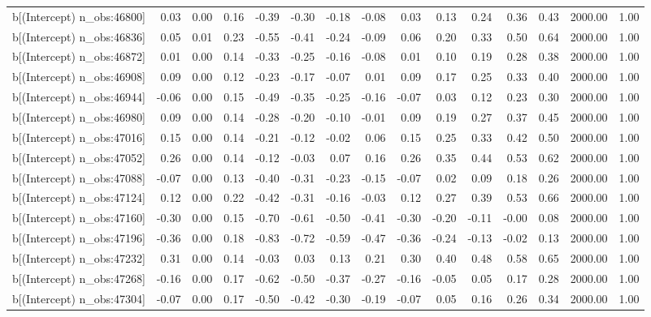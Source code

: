 \begin{table}[ht]
\begin{tabular}{rrrrrrrrrrrrrrr}
  b[(Intercept) n\_obs:46800] & 0.03 & 0.00 & 0.16 & -0.39 & -0.30 & -0.18 & -0.08 & 0.03 & 0.13 & 0.24 & 0.36 & 0.43 & 2000.00 & 1.00 \\ 
  b[(Intercept) n\_obs:46836] & 0.05 & 0.01 & 0.23 & -0.55 & -0.41 & -0.24 & -0.09 & 0.06 & 0.20 & 0.33 & 0.50 & 0.64 & 2000.00 & 1.00 \\ 
  b[(Intercept) n\_obs:46872] & 0.01 & 0.00 & 0.14 & -0.33 & -0.25 & -0.16 & -0.08 & 0.01 & 0.10 & 0.19 & 0.28 & 0.38 & 2000.00 & 1.00 \\ 
  b[(Intercept) n\_obs:46908] & 0.09 & 0.00 & 0.12 & -0.23 & -0.17 & -0.07 & 0.01 & 0.09 & 0.17 & 0.25 & 0.33 & 0.40 & 2000.00 & 1.00 \\ 
  b[(Intercept) n\_obs:46944] & -0.06 & 0.00 & 0.15 & -0.49 & -0.35 & -0.25 & -0.16 & -0.07 & 0.03 & 0.12 & 0.23 & 0.30 & 2000.00 & 1.00 \\ 
  b[(Intercept) n\_obs:46980] & 0.09 & 0.00 & 0.14 & -0.28 & -0.20 & -0.10 & -0.01 & 0.09 & 0.19 & 0.27 & 0.37 & 0.45 & 2000.00 & 1.00 \\ 
  b[(Intercept) n\_obs:47016] & 0.15 & 0.00 & 0.14 & -0.21 & -0.12 & -0.02 & 0.06 & 0.15 & 0.25 & 0.33 & 0.42 & 0.50 & 2000.00 & 1.00 \\ 
  b[(Intercept) n\_obs:47052] & 0.26 & 0.00 & 0.14 & -0.12 & -0.03 & 0.07 & 0.16 & 0.26 & 0.35 & 0.44 & 0.53 & 0.62 & 2000.00 & 1.00 \\ 
  b[(Intercept) n\_obs:47088] & -0.07 & 0.00 & 0.13 & -0.40 & -0.31 & -0.23 & -0.15 & -0.07 & 0.02 & 0.09 & 0.18 & 0.26 & 2000.00 & 1.00 \\ 
  b[(Intercept) n\_obs:47124] & 0.12 & 0.00 & 0.22 & -0.42 & -0.31 & -0.16 & -0.03 & 0.12 & 0.27 & 0.39 & 0.53 & 0.66 & 2000.00 & 1.00 \\ 
  b[(Intercept) n\_obs:47160] & -0.30 & 0.00 & 0.15 & -0.70 & -0.61 & -0.50 & -0.41 & -0.30 & -0.20 & -0.11 & -0.00 & 0.08 & 2000.00 & 1.00 \\ 
  b[(Intercept) n\_obs:47196] & -0.36 & 0.00 & 0.18 & -0.83 & -0.72 & -0.59 & -0.47 & -0.36 & -0.24 & -0.13 & -0.02 & 0.13 & 2000.00 & 1.00 \\ 
  b[(Intercept) n\_obs:47232] & 0.31 & 0.00 & 0.14 & -0.03 & 0.03 & 0.13 & 0.21 & 0.30 & 0.40 & 0.48 & 0.58 & 0.65 & 2000.00 & 1.00 \\ 
  b[(Intercept) n\_obs:47268] & -0.16 & 0.00 & 0.17 & -0.62 & -0.50 & -0.37 & -0.27 & -0.16 & -0.05 & 0.05 & 0.17 & 0.28 & 2000.00 & 1.00 \\ 
  b[(Intercept) n\_obs:47304] & -0.07 & 0.00 & 0.17 & -0.50 & -0.42 & -0.30 & -0.19 & -0.07 & 0.05 & 0.16 & 0.26 & 0.34 & 2000.00 & 1.00 \\ 

\end{tabular}
\end{table}
